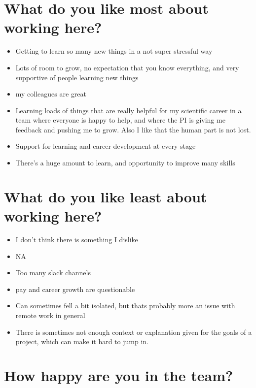 \documentclass[
]{book}
\providecommand{\tightlist}{%
  \setlength{\itemsep}{0pt}\setlength{\parskip}{0pt}}
\begin{document}
\hypertarget{what-do-you-like-most-about-working-here-1}{%
\section{What do you like most about working here?}\label{what-do-you-like-most-about-working-here-1}}

\begin{itemize}
\tightlist
\item
  Getting to learn so many new things in a not super stressful way
\item
  Lots of room to grow, no expectation that you know everything, and very supportive of people learning new things
\item
  my colleagues are great
\item
  Learning loads of things that are really helpful for my scientific career in a team where everyone is happy to help, and where the PI is giving me feedback and pushing me to grow. Also I like that the human part is not lost.
\item
  Support for learning and career development at every stage
\item
  There's a huge amount to learn, and opportunity to improve many skills
\end{itemize}

\hypertarget{what-do-you-like-least-about-working-here-1}{%
\section{What do you like least about working here?}\label{what-do-you-like-least-about-working-here-1}}

\begin{itemize}
\tightlist
\item
  I don't think there is something I dislike
\item
  NA
\item
  Too many slack channels
\item
  pay and career growth are questionable
\item
  Can sometimes fell a bit isolated, but thats probably more an issue with remote work in general
\item
  There is sometimes not enough context or explanation given for the goals of a project, which can make it hard to jump in.
\end{itemize}

\hypertarget{how-happy-are-you-in-the-team-1}{%
\section{How happy are you in the team?}\label{how-happy-are-you-in-the-team-1}}
\end{document}
